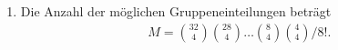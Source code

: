 \solution
    \begin{enumerate}
        \item Die Anzahl der möglichen Gruppeneinteilungen beträgt
            \begin{align*}
                M = \binom{32}{4} \binom{28}{4} \dots \binom{8}{4} \binom{4}{4} / 8!.
            \end{align*}
    \end{enumerate}

%


